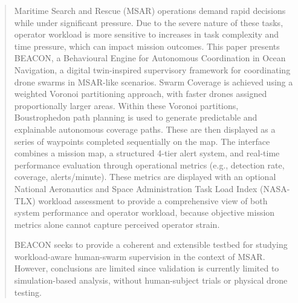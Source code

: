 \begin{abstract}
    Maritime Search and Rescue (MSAR) operations demand rapid decisions while under significant pressure.
    Due to the severe nature of these tasks, operator workload is more sensitive to increases in task complexity and time pressure, which can impact mission outcomes.
    This paper presents BEACON, a Behavioural Engine for Autonomous Coordination in Ocean Navigation, a digital twin-inspired supervisory framework for coordinating drone swarms in MSAR-like scenarios.
    Swarm Coverage is achieved using a weighted Voronoi partitioning approach, with faster drones assigned proportionally larger areas.
    Within these Voronoi partitions, Boustrophedon path planning is used to generate predictable and explainable autonomous coverage paths.
    These are then displayed as a series of waypoints completed sequentially on the map.
    The interface combines a mission map, a structured 4-tier alert system, and real-time performance evaluation through operational metrics (e.g., detection rate, coverage, alerts/minute).
    These metrics are displayed with an optional National Aeronautics and Space Administration Task Load Index (NASA-TLX) workload assessment to provide a comprehensive view of both system performance and operator workload, because objective mission metrics alone cannot capture perceived operator strain.

    BEACON seeks to provide a coherent and extensible testbed for studying workload-aware human-swarm supervision in the context of MSAR.
    However, conclusions are limited since validation is currently limited to simulation-based analysis, without human-subject trials or physical drone testing.
\end{abstract}
